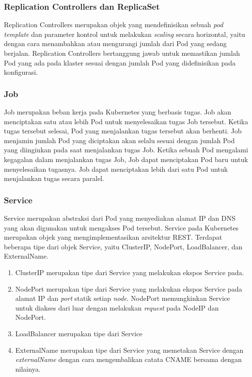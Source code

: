 \subsubsection{Replication Controllers dan ReplicaSet}

Replication Controllers merupakan objek yang mendefinisikan sebuah \emph{pod template}
dan parameter kontrol untuk melakukan \emph{scaling} secara horizontal, yaitu dengan
cara menambahkan atau mengurangi jumlah dari Pod yang sedang berjalan. Replication
Controllers bertanggung jawab untuk memastikan jumlah Pod yang ada pada klaster
sesuai dengan jumlah Pod yang didefinisikan pada konfigurasi.

\subsubsection{Job}

Job merupakan beban kerja pada Kubernetes yang berbasis tugas. Job akan menciptakan
satu atau lebih Pod untuk menyelesaikan tugas Job tersebut. Ketika tugas tersebut
selesai, Pod yang menjalankan tugas tersebut akan berhenti. Job menjamin jumlah
Pod yang diciptakan akan selalu sesuai dengan jumlah Pod yang diinginkan pada
saat menjalankan tugas Job. Ketika sebuah Pod mengalami kegagalan dalam menjalankan
tugas Job, Job dapat menciptakan Pod baru untuk menyelesaikan tugasnya. Job dapat
menciptakan lebih dari satu Pod untuk menjalankan tugas secara paralel.

\subsubsection{Service}

Service merupakan abstraksi dari Pod yang menyediakan alamat IP dan DNS yang
akan digunakan untuk mengakses Pod tersebut. Service pada Kubernetes merupakan
objek yang mengimplementasikan arsitektur REST. Terdapat beberapa tipe dari objek
Service, yaitu ClusterIP, NodePort, LoadBalancer, dan ExternalName.

\begin{enumerate}
  
  \item{ClusterIP merupakan tipe dari Service yang melakukan ekspos Service pada.}

  \item{
      NodePort merupakan tipe dari Service yang melakukan ekspos Service pada alamat IP
      dan \emph{port} statik setiap \emph{node}. NodePort memungkinkan Service untuk diakses dari luar
      dengan melakukan \emph{request} pada NodeIP dan NodePort.
    }

  \item{
      LoadBalancer merupakan tipe dari Service 
    }

  \item{
      ExternalName merupakan tipe dari Service yang memetakan Service dengan \emph{externalName}
      dengan cara mengembalikan catata CNAME bersama dengan nilainya.
    }

\end{enumerate}

